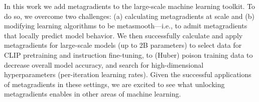 In this work we add metagradients to the large-scale machine learning toolkit.
To do so, we overcome two challenges: (a) calculating metagradients at scale and
(b) modifying learning algorithms to be metasmooth---i.e., to admit
metagradients that locally predict model behavior. We then successfully
calculate and apply metagradients for large-scale models (up to 2B parameters)
to select data for CLIP pretraining and instruction fine-tuning, 
to (Huber) poison training data to decrease overall model accuracy, 
and search for high-dimensional hyperparameters (per-iteration learning rates). 
Given the successful applications of metagradients in these settings, we are
excited to see what unlocking metagradients enables in other areas of machine
learning.



